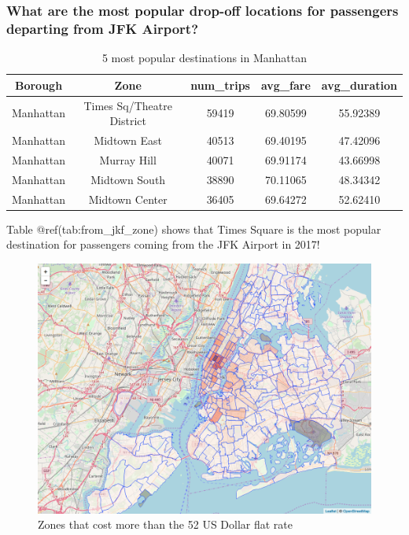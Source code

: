 \documentclass[12pt,twoside]{reedthesis}
\theoremstyle{definition}
\theoremstyle{definition}
\theoremstyle{definition}
\theoremstyle{remark}
\begin{document}
\subsubsection{What are the most popular drop-off locations for
passengers departing from JFK
Airport?}\label{what-are-the-most-popular-drop-off-locations-for-passengers-departing-from-jfk-airport}
\begin{table}

\caption{\label{tab:unnamed-chunk-97}5 most popular destinations in Manhattan}
\centering
\begin{tabular}[t]{ccccc}
\toprule
Borough & Zone & num\_trips & avg\_fare & avg\_duration\\
\midrule
Manhattan & Times Sq/Theatre District & 59419 & 69.80599 & 55.92389\\
Manhattan & Midtown East & 40513 & 69.40195 & 47.42096\\
Manhattan & Murray Hill & 40071 & 69.91174 & 43.66998\\
Manhattan & Midtown South & 38890 & 70.11065 & 48.34342\\
Manhattan & Midtown Center & 36405 & 69.64272 & 52.62410\\
\bottomrule
\end{tabular}
\end{table}
Table @ref(tab:from\_jkf\_zone) shows that Times Square is the most
popular destination for passengers coming from the JFK Airport in 2017!
\begin{figure}

{\centering \includegraphics[width=4.96in]{figure/from_jkf_num_trips} 

}

\caption{Zones that cost more than the 52 US Dollar flat rate}\label{fig:from-jkf-num-trips}
\end{figure}
\end{document}
